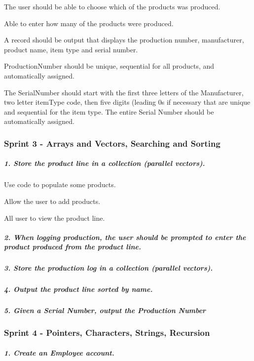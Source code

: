 \begin{DoxyItemize}
\item The user should be able to choose which of the products was produced.
\item Able to enter how many of the products were produced.
\item A record should be output that displays the production number, manufacturer, product name, item type and serial number.
\item Production\+Number should be unique, sequential for all products, and automatically assigned.
\item The Serial\+Number should start with the first three letters of the Manufacturer, two letter item\+Type code, then five digits (leading 0s if necessary that are unique and sequential for the item type. The entire Serial Number should be automatically assigned.
\end{DoxyItemize}

\subsubsection*{Sprint 3 -\/ Arrays and Vectors, Searching and Sorting}

\subparagraph*{1. Store the product line in a collection (parallel vectors).}


\begin{DoxyItemize}
\item Use code to populate some products.
\item Allow the user to add products.
\item All user to view the product line. \subparagraph*{2. When logging production, the user should be prompted to enter the product produced from the product line.}
\end{DoxyItemize}

\subparagraph*{3. Store the production log in a collection (parallel vectors).}

\subparagraph*{4. Output the product line sorted by name.}

\subparagraph*{5. Given a Serial Number, output the Production Number}

\subsubsection*{Sprint 4 -\/ Pointers, Characters, Strings, Recursion}

\subparagraph*{1. Create an Employee account.}


